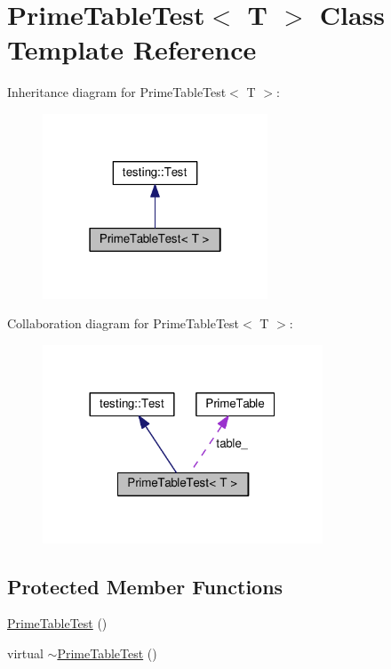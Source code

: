 \hypertarget{classPrimeTableTest}{}\section{Prime\+Table\+Test$<$ T $>$ Class Template Reference}
\label{classPrimeTableTest}


Inheritance diagram for Prime\+Table\+Test$<$ T $>$\+:\nopagebreak
\begin{figure}[H]
\begin{center}
\leavevmode
\includegraphics[width=190pt]{classPrimeTableTest__inherit__graph}
\end{center}
\end{figure}


Collaboration diagram for Prime\+Table\+Test$<$ T $>$\+:\nopagebreak
\begin{figure}[H]
\begin{center}
\leavevmode
\includegraphics[width=236pt]{classPrimeTableTest__coll__graph}
\end{center}
\end{figure}
\subsection*{Protected Member Functions}
\begin{DoxyCompactItemize}
\item 
\hyperlink{classPrimeTableTest_ab83d0b24b41bff1ace55f9a8d5ea6dcf}{Prime\+Table\+Test} ()
\item 
virtual \hyperlink{classPrimeTableTest_a4fb27ce277675d58ea3f8db99e3bb2b4}{$\sim$\+Prime\+Table\+Test} ()
\end{DoxyCompactItemize}
